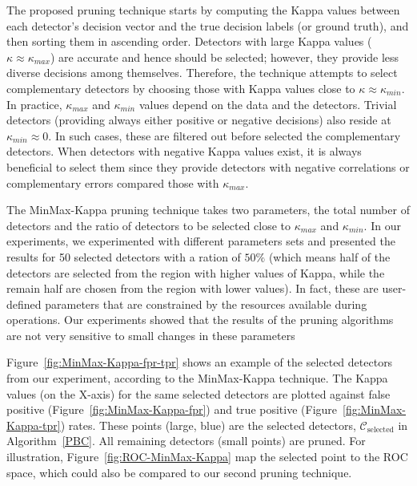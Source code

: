 The proposed pruning technique starts by computing the Kappa values between each detector's decision vector and the true decision labels (or ground truth), and then sorting them in ascending order.
Detectors with large Kappa values ($\kappa \approx \kappa_{max}$) are accurate and hence should be selected; however, they provide less diverse decisions among themselves.
Therefore, the technique attempts to select complementary detectors by choosing those with Kappa values close to $\kappa \approx \kappa_{min}$.
In practice, $\kappa_{max}$ and $\kappa_{min}$ values depend on the data and the detectors.
Trivial detectors (providing always either positive or negative decisions) also reside at $\kappa_{min} \approx 0$.
In such cases, these are filtered out before selected the complementary detectors.
When detectors with negative Kappa values exist, it is always beneficial to select them since they provide detectors with negative correlations or complementary errors compared those with $\kappa_{max}$.

The MinMax-Kappa pruning technique takes two parameters, the total number of detectors and the ratio of detectors to be selected close to  $\kappa_{max}$  and $\kappa_{min}$.
In our experiments, we experimented with different parameters sets and presented the results for 50 selected detectors with a ration of $50\%$ (which means half of the detectors are selected from the region with higher values of Kappa, while the remain half are chosen from the region with lower values). In fact, these are user-defined parameters that are constrained by the resources available during operations. Our experiments showed that the results of the pruning algorithms are not very sensitive to small changes in these parameters

Figure~\ref{fig:MinMax-Kappa-fpr-tpr} shows an example of the selected detectors from our experiment, according to the MinMax-Kappa technique.
The Kappa values (on the X-axis) for the same selected detectors are plotted against false positive (Figure~\ref{fig:MinMax-Kappa-fpr}) and true positive  (Figure~\ref{fig:MinMax-Kappa-tpr}) rates.
These points (large, blue) are the selected detectors, $\mathcal{C}_{\mbox{selected}}$ in Algorithm~\ref{PBC}.
All remaining detectors (small points) are pruned.
For illustration, Figure~\ref{fig:ROC-MinMax-Kappa} map the selected point to the ROC space, which could also be compared to our second pruning technique.

